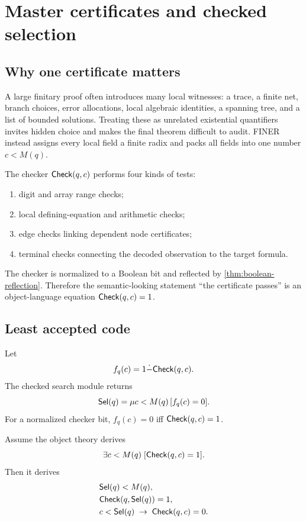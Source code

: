 \section{Master certificates and checked selection}
\label{sec:certificates}

\subsection{Why one certificate matters}

A large finitary proof often introduces many local witnesses: a trace, a finite net, branch choices, error allocations, local algebraic identities, a spanning tree, and a list of bounded solutions.  Treating these as unrelated existential quantifiers invites hidden choice and makes the final theorem difficult to audit.  FINER instead assigns every local field a finite radix and packs all fields into one number \(c<M(q)\).

The checker \(\mathsf{Check}(q,c)\) performs four kinds of tests:
\begin{enumerate}[label=(\roman*),leftmargin=2.3em]
\item digit and array range checks;
\item local defining-equation and arithmetic checks;
\item edge checks linking dependent node certificates;
\item terminal checks connecting the decoded observation to the target formula.
\end{enumerate}
The checker is normalized to a Boolean bit and reflected by \cref{thm:boolean-reflection}.  Therefore the semantic-looking statement ``the certificate passes'' is an object-language equation \(\mathsf{Check}(q,c)=1\).

\subsection{Least accepted code}

Let
\[
  f_q(c)=1\dot{-}\mathsf{Check}(q,c).
\]
The checked search module returns
\[
  \mathsf{Sel}(q)=\mu c<M(q)\,[f_q(c)=0].
\]
For a normalized checker bit, \(f_q(c)=0\) iff \(\mathsf{Check}(q,c)=1\).

\begin{theorem}
\label{thm:selected-certificate}
Assume the object theory derives
\begin{equation}
  \exists c<M(q)\;[\mathsf{Check}(q,c)=1].
  \label{eq:accepted-exists}
\end{equation}
Then it derives
\begin{align}
  &\mathsf{Sel}(q)<M(q),\label{eq:selected-bound}\\
  &\mathsf{Check}(q,\mathsf{Sel}(q))=1,\label{eq:selected-accept}\\
  &c<\mathsf{Sel}(q)\;\to\;\mathsf{Check}(q,c)=0.\label{eq:selected-minimal}
\end{align}
\end{theorem}

